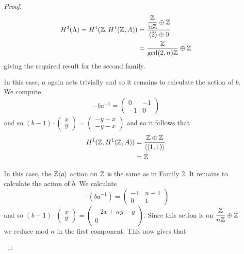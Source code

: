\begin{proof}
    \begin{align*}
        H^2(\Lambda) = H^1(\mathbb{Z}, H^1(\mathbb{Z}, A)) & = \dfrac{\dfrac{\mathbb{Z}}{n\mathbb{Z}} \oplus \mathbb{Z}}{\langle \tilde{2} \rangle \oplus 0} \\
                                           & = \dfrac{\mathbb{Z}}{\text{gcd}(2,n) \mathbb{Z}}\oplus \mathbb{Z}
    \end{align*}
    giving the required result for the second family.

    \begin{case}[Family 3]
        In this case, $a$ again acts trivially and so it remains to calculate the action of $b$. We compute
        \begin{align*}
            -ba^{-1} = \begin{pmatrix}
                           0  & -1 \\
                           -1 & 0
                       \end{pmatrix}
        \end{align*}
        and so $(b-1)\cdot \begin{pmatrix}
                x \\ y
            \end{pmatrix} = \begin{pmatrix}
                -y-x \\ -y-x
            \end{pmatrix}$
        and so it follows that
        \begin{align*}
            H^1(\mathbb{Z}, H^1(\mathbb{Z}, A)) & = \dfrac{\mathbb{Z} \oplus \mathbb{Z}}{\langle (1,1) \rangle} \\
                                & = \mathbb{Z}
        \end{align*}
    \end{case}

    \begin{case}[Family 4]
        In this case, the $\mathbb{Z}\langle a\rangle$ action on $\mathbb{Z}$ is the same as in Family 2. It remains to calculate the action of $b$. We calculate
        $$
            -(ba^{-1}) = \begin{pmatrix}
                -1 & n-1 \\
                0  & 1
            \end{pmatrix}
        $$
        and so $(b-1)\cdot \begin{pmatrix}
                x \\
                y
            \end{pmatrix} = \begin{pmatrix}
                -2x +ny - y \\
                0
            \end{pmatrix}$. Since this action is on $\dfrac{\mathbb{Z}}{n \mathbb{Z}} \oplus \mathbb{Z}$ we reduce mod $n$ in the first component. This now gives that


\end{case}
\end{proof}
